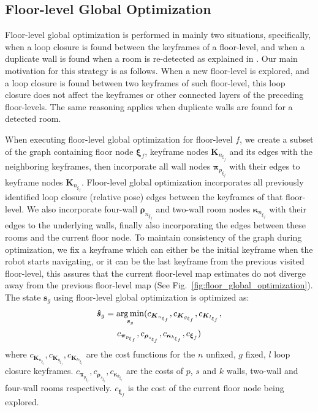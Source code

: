 \subsection{Floor-level Global Optimization}

Floor-level global optimization is performed in mainly two situations, specifically, when a loop closure is found between the keyframes of a floor-level, and when a duplicate wall is found when a room is re-detected as explained in \cite{s_graphs+}. Our main motivation for this strategy is as follows.  When a new floor-level is explored, and a loop closure is found between two keyframes of such floor-level, this loop closure does not affect the keyframes or other connected layers of the preceding floor-levels. The same reasoning applies when duplicate walls are found for a detected room. 

When executing floor-level global optimization for floor-level $f$, we create a subset of the graph containing floor node $\boldsymbol{\xi}_f$, keyframe nodes $\boldsymbol{K}_{{n}_{\xi_f}}$ and its edges with the neighboring keyframes, then incorporate all wall nodes $\boldsymbol{\pi}_{p_{\xi_f}}$ with their edges to keyframe nodes $\boldsymbol{K}_{{n}_{\xi_f}}$. Floor-level global optimization incorporates all previously identified loop closure (relative pose) edges between the keyframes of that floor-level. 
We also incorporate four-wall $\boldsymbol{\rho}_{n_{\xi_f}}$ and two-wall room nodes $\boldsymbol{\kappa}_{n_{\xi_f}}$ with their edges to the underlying walls, finally also incorporating the edges between these rooms and the current floor node. To maintain consistency of the graph during optimization, we fix a keyframe which can either be the initial keyframe when the robot starts navigating, or it can be the last keyframe from the previous visited floor-level, this assures that the current floor-level map estimates do not diverge away from the previous floor-level map (See Fig.~\ref{fig:floor_global_optimization}). The state $\boldsymbol{s}_g$ using floor-level global optimization is optimized as:
%
\begin{multline}
\boldsymbol{\hat{s}}_g = \operatorname*{arg\,min}_{\boldsymbol{s}_g} (c_{\boldsymbol{K}_{{n}_{\xi_f}}}, c_{\boldsymbol{K}_{{g}_{\xi_f}}}, c_{\boldsymbol{K}_{{l}_{\xi_f}}}, \\ 
c_{\boldsymbol{\pi}_{p_{\xi_f}}}, c_{\boldsymbol{\rho}_{s_{\xi_f}}}, c_{\boldsymbol{\kappa}_{k_{\xi_f}}}, c_{\boldsymbol{\xi}_f})
\end{multline}
%
where $c_{\boldsymbol{K}_{{n}_{\xi_f}}}, c_{\boldsymbol{K}_{{g}_{\xi_f}}}, c_{\boldsymbol{K}_{{lc}_{\xi_f}}}$ are the cost functions for the $n$ unfixed, $g$ fixed, $l$ loop closure keyframes. $c_{\boldsymbol{\pi}_{p_{\xi_f}}}, c_{\boldsymbol{\rho}_{s_{\xi_f}}}, c_{\boldsymbol{\kappa}_{k_{\xi_f}}}$ are the costs of $p$, $s$ and $k$ walls, two-wall and four-wall rooms respectively. $c_{\boldsymbol{\xi}_f}$ is the cost of the current floor node being explored. 

